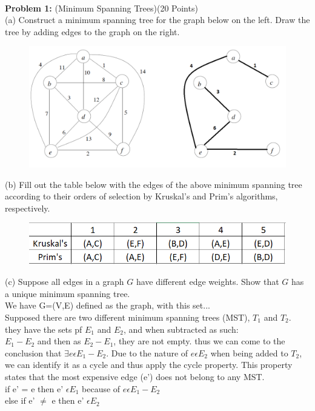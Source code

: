 \documentclass[11pt]{amsart}
\begin{document}
\newpage
\hrulefill \\

\textbf{Problem 1:} (Minimum Spanning Trees)\hfill (20 Points)\\

(a) Construct a minimum spanning tree for the graph below on the left. Draw the tree by adding edges to the graph on the right.

\begin{figure}[htb]
\begin{center}
\includegraphics[width=\textwidth]{1a}
\end{center}
\end{figure}

(b) Fill out the table below with the edges of the above minimum spanning tree according to their orders of selection by Kruskal's 
and Prim's algorithms, respectively.

\begin{figure}[htb]
\begin{center}
\includegraphics[width=\textwidth]{1b}
\end{center}
\end{figure}

(c) Suppose all edges in a graph $G$ have different edge weights. Show that $G$ has a unique minimum spanning tree. 
\smallskip
\\
We have G=(V,E) defined as the graph, with this set...\\
Supposed there are two different minimum spanning trees (MST), $T_1$ and $T_2$. they have the sets pf $E_1$ and $E_2$, and when subtracted as such: 
\\$E_1 - E_2$ and then as $E_2 - E_1$, they are not empty. thus we can come to the conclusion that $\exists e \epsilon  E_1 - E_2$. Due to the nature of $e \epsilon E_2$ when being added to $T_2$, we can identify it as a cycle and thus apply the cycle property. This property states that the most expensive edge (e') does not belong to any MST.\\
if e' = e then e' $\epsilon E_1$ because of $e \epsilon E_1 - E_2$\\
else if e' $\neq$ e then e' $\epsilon E_2$
\newpage
\hrulefill \\
\end{document}
